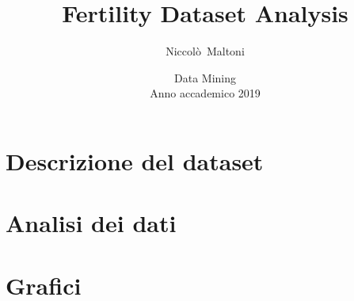\documentclass[a4paper,11pt,twoside,notitlepage,final]{scrartcl}
\title{\LARGE{\textbf{Fertility Dataset Analysis}}}
\author{Niccolò~Maltoni}
\date{%
  \small{Data Mining}\\%
  \small{Anno accademico 2019}
}
\begin{document}
\maketitle

\section{Descrizione del dataset}
\section{Analisi dei dati}
\section{Grafici}
\end{document}
